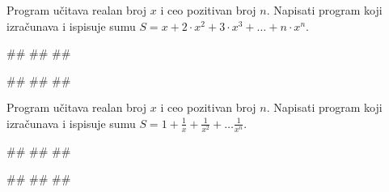 \begin{Exercise}[label=1.3_40]
 Program učitava realan broj $x$ i ceo pozitivan broj $n$. Napisati
 program koji izračunava i ispisuje sumu $S=x+2\cdot x^2+3\cdot
 x^3+\ldots+n\cdot x^n$.
 
\begin{miditest}
\begin{upotreba}{1}
#\naslovInt#
##
##
\end{upotreba}
\end{miditest}
\begin{miditest}
\begin{upotreba}{2}
#\naslovInt#
##
##
\end{upotreba}
\end{miditest}
\end{Exercise}
\begin{Answer}[ref=1.3_40]
\end{Answer}


\begin{Exercise}[label=1.3_41]
 Program učitava realan broj $x$ i ceo pozitivan broj $n$. Napisati
 program koji izračunava i ispisuje sumu
 $S=1+\frac{1}{x}+\frac{1}{x^2}+\ldots\frac{1}{x^n}$.
 
\begin{miditest}
\begin{upotreba}{1}
#\naslovInt#
##
##
\end{upotreba}
\end{miditest}
\begin{miditest}
\begin{upotreba}{2}
#\naslovInt#
##
##
\end{upotreba}
\end{miditest}
\end{Exercise}
\begin{Answer}[ref=1.3_41]
\end{Answer}


